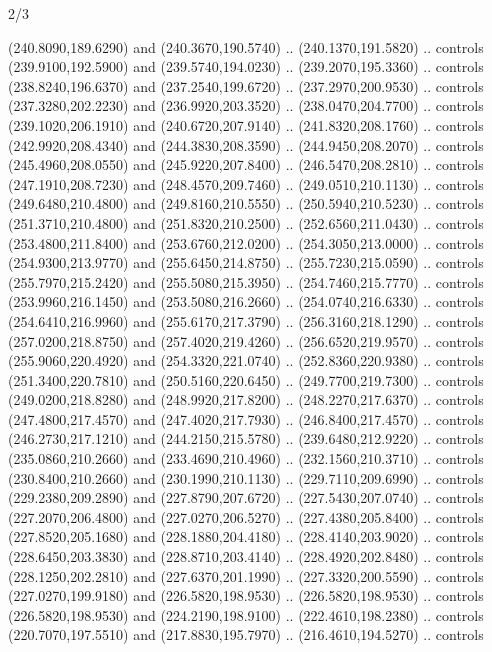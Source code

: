 \begin{flagdescription}{2/3}
\begin{scope}[xshift=0.5\flaglength,yshift=0.5\flagwidth,scale=\flagwidth/259.2]
\begin{scope}[y=0.8pt, x=0.8pt, yscale=-1,shift={(-243,-162)}]
      (240.8090,189.6290) and (240.3670,190.5740) .. (240.1370,191.5820) .. controls
      (239.9100,192.5900) and (239.5740,194.0230) .. (239.2070,195.3360) .. controls
      (238.8240,196.6370) and (237.2540,199.6720) .. (237.2970,200.9530) .. controls
      (237.3280,202.2230) and (236.9920,203.3520) .. (238.0470,204.7700) .. controls
      (239.1020,206.1910) and (240.6720,207.9140) .. (241.8320,208.1760) .. controls
      (242.9920,208.4340) and (244.3830,208.3590) .. (244.9450,208.2070) .. controls
      (245.4960,208.0550) and (245.9220,207.8400) .. (246.5470,208.2810) .. controls
      (247.1910,208.7230) and (248.4570,209.7460) .. (249.0510,210.1130) .. controls
      (249.6480,210.4800) and (249.8160,210.5550) .. (250.5940,210.5230) .. controls
      (251.3710,210.4800) and (251.8320,210.2500) .. (252.6560,211.0430) .. controls
      (253.4800,211.8400) and (253.6760,212.0200) .. (254.3050,213.0000) .. controls
      (254.9300,213.9770) and (255.6450,214.8750) .. (255.7230,215.0590) .. controls
      (255.7970,215.2420) and (255.5080,215.3950) .. (254.7460,215.7770) .. controls
      (253.9960,216.1450) and (253.5080,216.2660) .. (254.0740,216.6330) .. controls
      (254.6410,216.9960) and (255.6170,217.3790) .. (256.3160,218.1290) .. controls
      (257.0200,218.8750) and (257.4020,219.4260) .. (256.6520,219.9570) .. controls
      (255.9060,220.4920) and (254.3320,221.0740) .. (252.8360,220.9380) .. controls
      (251.3400,220.7810) and (250.5160,220.6450) .. (249.7700,219.7300) .. controls
      (249.0200,218.8280) and (248.9920,217.8200) .. (248.2270,217.6370) .. controls
      (247.4800,217.4570) and (247.4020,217.7930) .. (246.8400,217.4570) .. controls
      (246.2730,217.1210) and (244.2150,215.5780) .. (239.6480,212.9220) .. controls
      (235.0860,210.2660) and (233.4690,210.4960) .. (232.1560,210.3710) .. controls
      (230.8400,210.2660) and (230.1990,210.1130) .. (229.7110,209.6990) .. controls
      (229.2380,209.2890) and (227.8790,207.6720) .. (227.5430,207.0740) .. controls
      (227.2070,206.4800) and (227.0270,206.5270) .. (227.4380,205.8400) .. controls
      (227.8520,205.1680) and (228.1880,204.4180) .. (228.4140,203.9020) .. controls
      (228.6450,203.3830) and (228.8710,203.4140) .. (228.4920,202.8480) .. controls
      (228.1250,202.2810) and (227.6370,201.1990) .. (227.3320,200.5590) .. controls
      (227.0270,199.9180) and (226.5820,198.9530) .. (226.5820,198.9530) .. controls
      (226.5820,198.9530) and (224.2190,198.9100) .. (222.4610,198.2380) .. controls
      (220.7070,197.5510) and (217.8830,195.7970) .. (216.4610,194.5270) .. controls

\end{scope}
\end{scope}
\end{flagdescription}
